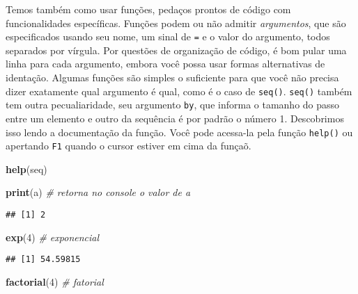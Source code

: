 \documentclass[]{article}
\newenvironment{Shaded}{\begin{snugshade}}{\end{snugshade}}
\newcommand{\CommentTok}[1]{\textcolor[rgb]{0.56,0.35,0.01}{\textit{#1}}}
\newcommand{\DecValTok}[1]{\textcolor[rgb]{0.00,0.00,0.81}{#1}}
\newcommand{\KeywordTok}[1]{\textcolor[rgb]{0.13,0.29,0.53}{\textbf{#1}}}
\newcommand{\NormalTok}[1]{#1}
\begin{document}
Temos também como usar funções, pedaços prontos de código com
funcionalidades específicas. Funções podem ou não admitir
\emph{argumentos}, que são especificados usando seu nome, um sinal de
\texttt{=} e o valor do argumento, todos separados por vírgula. Por
questões de organização de código, é bom pular uma linha para cada
argumento, embora você possa usar formas alternativas de identação.
Algumas funções são simples o suficiente para que você não precisa dizer
exatamente qual argumento é qual, como é o caso de \texttt{seq()}.
\texttt{seq()} também tem outra pecualiaridade, seu argumento
\texttt{by}, que informa o tamanho do passo entre um elemento e outro da
sequência é por padrão o número 1. Descobrimos isso lendo a documentação
da função. Você pode acessa-la pela função \texttt{help()} ou apertando
\texttt{F1} quando o cursor estiver em cima da funçaõ.

\begin{Shaded}
\begin{Highlighting}[]
\KeywordTok{help}\NormalTok{(seq)}
\end{Highlighting}
\end{Shaded}

\begin{Shaded}
\begin{Highlighting}[]
\KeywordTok{print}\NormalTok{(a) }\CommentTok{# retorna no console o valor de a}
\end{Highlighting}
\end{Shaded}

\begin{verbatim}
## [1] 2
\end{verbatim}

\begin{Shaded}
\begin{Highlighting}[]
\KeywordTok{exp}\NormalTok{(}\DecValTok{4}\NormalTok{) }\CommentTok{# exponencial}
\end{Highlighting}
\end{Shaded}

\begin{verbatim}
## [1] 54.59815
\end{verbatim}

\begin{Shaded}
\begin{Highlighting}[]
\KeywordTok{factorial}\NormalTok{(}\DecValTok{4}\NormalTok{) }\CommentTok{# fatorial}
\end{Highlighting}
\end{Shaded}
\end{document}
